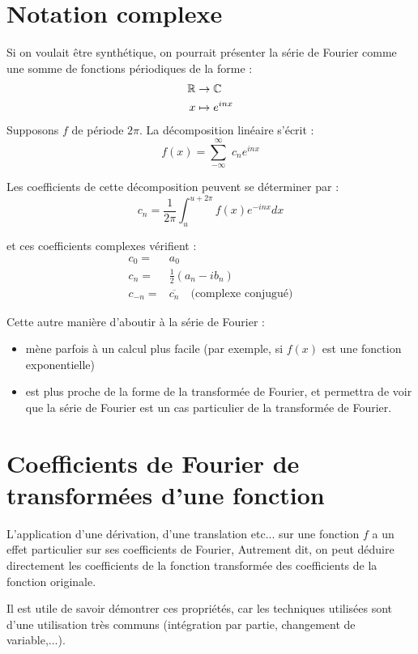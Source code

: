 \section{Notation complexe}

Si on voulait être synthétique, on pourrait présenter la série de
Fourier comme une somme de fonctions périodiques de la forme :
\begin{eqnarray}
\mathbb{R} & \rightarrow \mathbb{C} \\
x & \mapsto e^{inx}
\end{eqnarray}
Supposons $f$ de période $2\pi$. 
La décomposition linéaire s'écrit :
\begin{equation}
f(x)=\sum_{-\infty}^{\infty}\; c_n e^{inx}
\end{equation}

Les coefficients de cette décomposition peuvent se déterminer par :
\begin{equation}
c_n=\frac{1}{2\pi}\int_{u}^{u+2\pi} f(x)e^{-inx}dx
\label{version_complexe}
\end{equation}

et ces coefficients complexes vérifient :
\begin{eqnarray}
c_0=&a_0 \\ 
c_n=&\frac{1}{2}(a_n-ib_n) \\
c_{-n}=& \overline{c_n} \text{~~~(complexe conjugué)}
\end{eqnarray}

Cette autre manière d'aboutir à la série de Fourier :
\begin{itemize}
\item mène parfois à un calcul plus facile (par exemple, si $f(x)$ est une fonction exponentielle)
\item est plus proche de la forme de la transformée de Fourier, et permettra de voir que la série de Fourier est un cas particulier de la transformée de Fourier.
\end{itemize}


\section{Coefficients de Fourier de transformées d'une fonction}
L'application d'une dérivation, d'une translation etc...  sur une
fonction $f$ a un effet particulier sur ses coefficients de Fourier, 
Autrement dit, on peut déduire directement les coefficients de la fonction transformée
des coefficients de la fonction originale.

\medskip Il est utile de savoir démontrer ces propriétés, car les techniques utilisées sont d'une utilisation très communs (intégration par partie, changement de variable,...).

